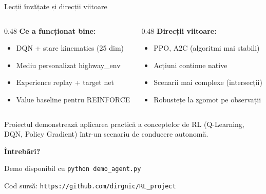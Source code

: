 \documentclass[aspectratio=169]{beamer}
\begin{document}
\begin{frame}{Lecții învățate și direcții viitoare}
  \begin{columns}
    \begin{column}{0.48\textwidth}
      \textbf{Ce a funcționat bine:}
      \begin{itemize}
        \item DQN + stare kinematics (25 dim)
        \item Mediu personalizat highway\_env
        \item Experience replay + target net
        \item Value baseline pentru REINFORCE
      \end{itemize}
    \end{column}
    \begin{column}{0.48\textwidth}
      \textbf{Direcții viitoare:}
      \begin{itemize}
        \item PPO, A2C (algoritmi mai stabili)
        \item Acțiuni continue native
        \item Scenarii mai complexe (intersecții)
        \item Robustețe la zgomot pe observații
      \end{itemize}
    \end{column}
  \end{columns}
  
  \vspace{0.5cm}
  \centering
  \begin{block}{}
    \centering
    Proiectul demonstrează aplicarea practică a conceptelor de RL (Q-Learning, DQN, Policy Gradient) într-un scenariu de conducere autonomă.
  \end{block}
\end{frame}

\begin{frame}{}
  \centering
  \Huge \textbf{Întrebări?}
  
  \vspace{1cm}
  \large Demo disponibil cu \texttt{python demo\_agent.py}
  
  \vspace{0.5cm}
  \normalsize
  Cod sursă: \texttt{https://github.com/dirgnic/RL\_project}
\end{frame}
\end{document}
